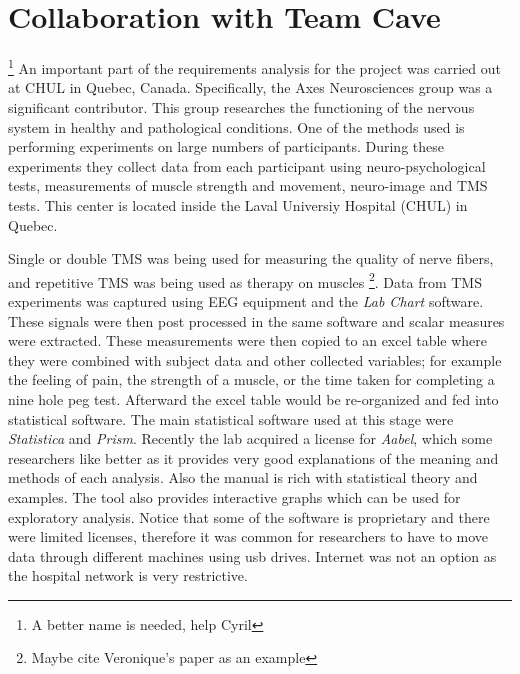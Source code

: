 
\section{Collaboration with Team Cave}

\footnote{A better name is needed, help Cyril} An important part of the requirements analysis for the project was carried out at CHUL in Quebec, Canada. Specifically, the Axes Neurosciences group was a significant contributor. This group researches the functioning of the nervous system in healthy and pathological conditions. One of the methods used is performing experiments on large numbers of participants. During these experiments they collect data from each participant using neuro-psychological tests, measurements of muscle strength and movement, neuro-image and TMS tests. This center is located inside the Laval Universiy Hospital (CHUL) in Quebec.

Single or double TMS was being used for measuring the quality of nerve fibers, and repetitive TMS was being used as therapy on muscles \footnote{Maybe cite Veronique's paper as an example}. Data from TMS experiments was captured using EEG equipment and the \emph{Lab Chart} software. These signals were then post processed in the same software and scalar measures were extracted. These measurements were then copied to an excel table where they were combined with subject data and other collected variables; for example the feeling of pain, the strength of a muscle, or the time taken for completing a nine hole peg test. Afterward the excel table would be re-organized and fed into statistical software. The main statistical software used at this stage were \emph{Statistica} and \emph{Prism}. Recently the lab acquired a license for \emph{Aabel}, which some researchers like better as it provides very good explanations of the meaning and methods of each analysis. Also the manual is rich with statistical theory and examples. The tool also provides interactive graphs which can be used for exploratory analysis. Notice that some of the software is proprietary and there were limited licenses, therefore it was common for researchers to have to move data through different machines using usb drives. Internet was not an option as the hospital network is very restrictive.


